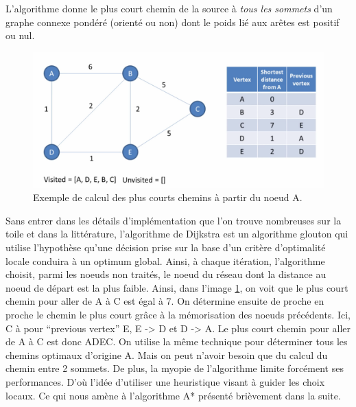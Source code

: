 L'algorithme donne le plus court chemin de la source à \textit{tous les sommets} d'un graphe 
connexe pondéré (orienté ou non) dont le poids lié aux arêtes est positif ou nul.



 


\begin{figure}[htp]
  \centering
  \includegraphics[width=15cm]{images/algo_dij}
  \caption{Exemple de calcul des plus courts chemins à partir du noeud A.}
  \label{fig:graph_dij}
\end{figure}

Sans entrer dans les détails d'implémentation que l'on trouve nombreuses sur la toile et dans la littérature, l'algorithme de Dijkstra est 
un algorithme glouton qui utilise l'hypothèse qu'une décision prise sur la base
d'un critère d'optimalité locale conduira à un optimum global. Ainsi, à chaque itération, l'algorithme choisit, parmi les noeuds non traités, le noeud
du réseau dont la distance au noeud de départ est la plus faible. Ainsi, dans l'image \ref{fig:graph_dij}, on voit que le plus court chemin pour aller de A à C
est égal à 7. On détermine ensuite de proche en proche le chemin le plus court grâce à la mémorisation des noeuds précédents. Ici, C à pour ``previous vertex'' E, 
E -> D et D -> A. Le plus court chemin pour aller de A à C est donc ADEC. On utilise la même technique pour déterminer tous les chemins optimaux 
d'origine A. Mais on peut n'avoir besoin que du calcul du chemin entre 2 sommets. De plus, la myopie de l'algorithme limite forcément ses performances. D'où l'idée
d'utiliser une heuristique visant à guider les choix locaux. Ce qui nous amène à l'algorithme A* présenté brièvement dans la suite.

%   
